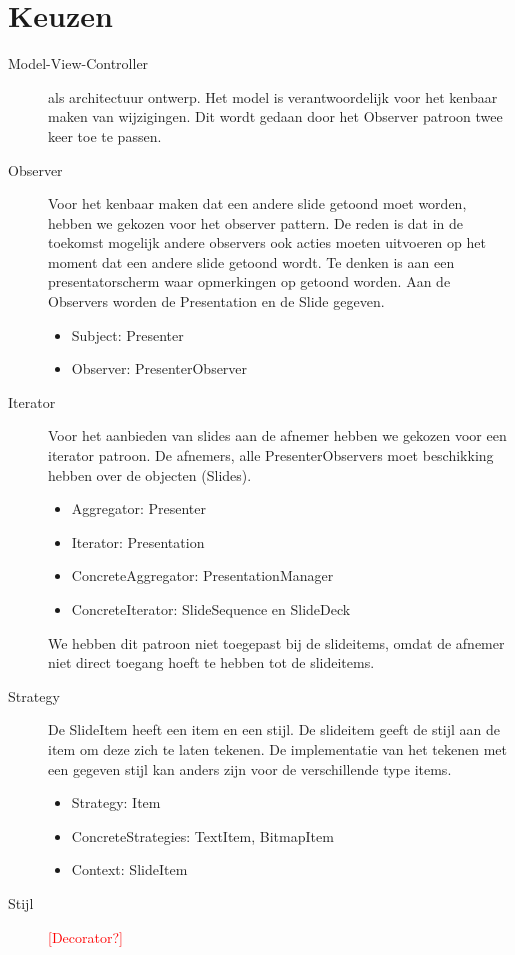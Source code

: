 \documentclass[a4paper]{article}
\newcommand{\todo}[1]{\textcolor{red}{[#1]}}
\begin{document}
\section{Keuzen}
\begin{description}
\item[Model-View-Controller] als architectuur ontwerp. Het model is verantwoordelijk voor het kenbaar maken van wijzigingen. Dit wordt gedaan door het Observer patroon twee keer toe te passen.
\item[Observer] Voor het kenbaar maken dat een andere slide getoond moet worden, hebben we gekozen voor het observer pattern. De reden is dat in de toekomst mogelijk andere observers ook acties moeten uitvoeren op het moment dat een andere slide getoond wordt. Te denken is aan een presentatorscherm waar opmerkingen op getoond worden. Aan de Observers worden de Presentation en de Slide gegeven.
\begin{itemize}
\item Subject: Presenter
\item Observer: PresenterObserver
\end{itemize}
\item[Iterator] Voor het aanbieden van slides aan de afnemer hebben we gekozen voor een iterator patroon. De afnemers, alle PresenterObservers moet beschikking hebben over de objecten (Slides).
\begin{itemize}
\item Aggregator: Presenter
\item Iterator: Presentation
\item ConcreteAggregator: PresentationManager
\item ConcreteIterator: SlideSequence en SlideDeck
\end{itemize}
We hebben dit patroon niet toegepast bij de slideitems, omdat de afnemer niet direct toegang hoeft te hebben tot de slideitems.

\item[Strategy] De SlideItem heeft een item en een stijl. De slideitem geeft de stijl aan de item om deze zich te laten tekenen. De implementatie van het tekenen met een gegeven stijl kan anders zijn voor de verschillende type items.
\begin{itemize}
\item Strategy: Item
\item ConcreteStrategies: TextItem, BitmapItem
\item Context: SlideItem
\end{itemize}

\item[Stijl] \todo{Decorator?}
\end{description}
\end{document}

